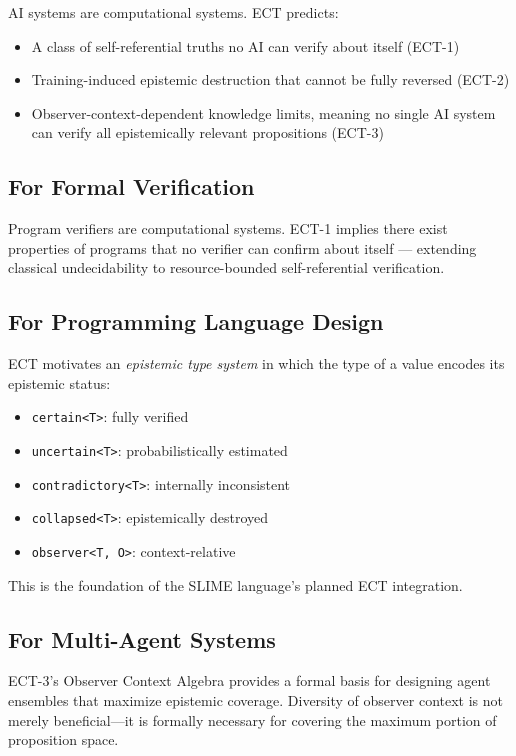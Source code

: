 \documentclass[12pt]{article}
\theoremstyle{definition}
\begin{document}
AI systems are computational systems. ECT predicts:
\begin{itemize}[leftmargin=1.5em]
  \item A class of self-referential truths no AI can verify about itself (ECT-1)
  \item Training-induced epistemic destruction that cannot be fully reversed (ECT-2)
  \item Observer-context-dependent knowledge limits, meaning no single AI system can verify all epistemically relevant propositions (ECT-3)
\end{itemize}

\subsection{For Formal Verification}

Program verifiers are computational systems. ECT-1 implies there exist properties of programs that no verifier can confirm about itself --- extending classical undecidability to resource-bounded self-referential verification.

\subsection{For Programming Language Design}

ECT motivates an \emph{epistemic type system} in which the type of a value encodes its epistemic status:
\begin{itemize}[leftmargin=1.5em]
  \item \texttt{certain<T>}: fully verified
  \item \texttt{uncertain<T>}: probabilistically estimated
  \item \texttt{contradictory<T>}: internally inconsistent
  \item \texttt{collapsed<T>}: epistemically destroyed
  \item \texttt{observer<T, O>}: context-relative
\end{itemize}
This is the foundation of the SLIME language's planned ECT integration.

\subsection{For Multi-Agent Systems}

ECT-3's Observer Context Algebra provides a formal basis for designing agent ensembles that maximize epistemic coverage. Diversity of observer context is not merely beneficial---it is formally necessary for covering the maximum portion of proposition space.
\end{document}
